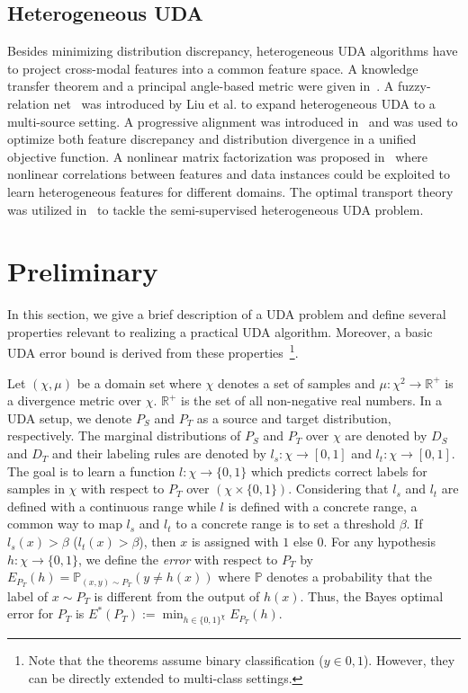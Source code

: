 \documentclass[journal,twocolumn]{IEEEtran}
\theoremstyle{definition}
\begin{document}
\subsection{Heterogeneous UDA}
Besides minimizing distribution discrepancy, heterogeneous UDA algorithms have to project cross-modal features into a common feature space. A knowledge transfer theorem and a principal angle-based metric were given in~\cite{9023553}. A fuzzy-relation net~\cite{9172137} was introduced by Liu et al. to expand heterogeneous UDA  to a multi-source setting. A progressive alignment was introduced in~\cite{8475006} and was used to optimize both feature discrepancy and distribution divergence in a unified objective function. A nonlinear matrix factorization was proposed in~\cite{8725935} where nonlinear correlations between features and data instances could be exploited to learn heterogeneous features for different domains. The optimal transport theory was utilized in~\cite{ijcai2018-412} to tackle the semi-supervised  heterogeneous UDA problem.

\section{Preliminary}
\label{prelinary}
In this section, we give a brief description of a UDA problem and define several properties relevant to realizing  a practical UDA algorithm. Moreover, a basic UDA error bound is derived from these properties~\cite{Ben-David2014}\footnote {Note that the theorems assume binary classification ($y\in {0, 1}$). However, they can be directly extended to multi-class settings.}. 

Let $(\chi, \mu)$ be a domain set where $\chi$ denotes a set of samples and $\mu: \chi^{2}\rightarrow\mathbb{R}^{+}$ is a divergence metric over $\chi$. $\mathbb{R}^{+}$ is the set of all non-negative real numbers. In a UDA setup, we denote $P_{S}$ and $P_{T}$ as a source and target distribution, respectively. The marginal distributions of $P_{S}$ and $P_{T}$ over $\chi$ are denoted by $D_{S}$ and $D_{T}$ and their labeling rules are denoted by $l_s: \chi\rightarrow[0, 1]$ and $l_t: \chi\rightarrow[0, 1]$. The goal is to learn a function $l:\chi\rightarrow\{0, 1\}$ which predicts correct labels for samples in $\chi$ with respect to $P_{T}$ over $(\chi\times\{0, 1\})$. Considering that $l_s$ and $l_t$ are defined with a continuous range while $l$ is defined with a concrete range, a common way to map $l_s$ and $l_t$ to a concrete range is to set a threshold $\beta$. If $l_s(x)>\beta$ ($l_t(x)>\beta$), then $x$ is assigned with $1$ else $0$.   For any hypothesis $h:\chi\rightarrow\{0, 1\}$, we define the \textit{error} with respect to $P_{T}$ by $E_{P_{T}}(h)=\mathbb{P}_{(x, y)\sim P_{T}}(y\neq h(x))$ where $\mathbb{P}$ denotes a probability that the label of $x\sim P_{T}$ is different from the output of $h(x)$. Thus, the Bayes optimal error for $P_{T}$ is $E^*(P_{T}):= \min_{h\in\{0, 1\}^{\chi}}E_{P_{T}}(h)$.
\end{document}
